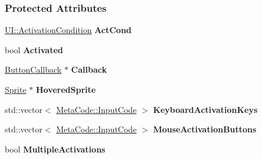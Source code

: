 \subsubsection*{Protected Attributes}
\begin{DoxyCompactItemize}
\item 
\hypertarget{classMezzanine_1_1UI_1_1Button_ab8ec63546baad2c3fe73833c55185026}{
\hyperlink{namespaceMezzanine_1_1UI_aca58497951b1b9c7da10f214da3392f0}{UI::ActivationCondition} {\bfseries ActCond}}
\label{classMezzanine_1_1UI_1_1Button_ab8ec63546baad2c3fe73833c55185026}

\item 
\hypertarget{classMezzanine_1_1UI_1_1Button_a0e48b926861702094676ea5d329933fb}{
bool {\bfseries Activated}}
\label{classMezzanine_1_1UI_1_1Button_a0e48b926861702094676ea5d329933fb}

\item 
\hypertarget{classMezzanine_1_1UI_1_1Button_a2aafa20c1e6ff918cbe6374b773f5320}{
\hyperlink{classMezzanine_1_1UI_1_1ButtonCallback}{ButtonCallback} $\ast$ {\bfseries Callback}}
\label{classMezzanine_1_1UI_1_1Button_a2aafa20c1e6ff918cbe6374b773f5320}

\item 
\hypertarget{classMezzanine_1_1UI_1_1Button_ab22a57c3999b872f7167e64c2c1aac9b}{
\hyperlink{structMezzanine_1_1UI_1_1Sprite}{Sprite} $\ast$ {\bfseries HoveredSprite}}
\label{classMezzanine_1_1UI_1_1Button_ab22a57c3999b872f7167e64c2c1aac9b}

\item 
\hypertarget{classMezzanine_1_1UI_1_1Button_a3fc77631f527f820b3ee2f00a5be50f1}{
std::vector$<$ \hyperlink{classMezzanine_1_1MetaCode_a3b5633f0145bf3287cf53a3f05b5563c}{MetaCode::InputCode} $>$ {\bfseries KeyboardActivationKeys}}
\label{classMezzanine_1_1UI_1_1Button_a3fc77631f527f820b3ee2f00a5be50f1}

\item 
\hypertarget{classMezzanine_1_1UI_1_1Button_aab112d6485c6ddd70dd638f3e8454d5d}{
std::vector$<$ \hyperlink{classMezzanine_1_1MetaCode_a3b5633f0145bf3287cf53a3f05b5563c}{MetaCode::InputCode} $>$ {\bfseries MouseActivationButtons}}
\label{classMezzanine_1_1UI_1_1Button_aab112d6485c6ddd70dd638f3e8454d5d}

\item 
\hypertarget{classMezzanine_1_1UI_1_1Button_ae3eabadf14193c4e125e64daa419527f}{
bool {\bfseries MultipleActivations}}
\label{classMezzanine_1_1UI_1_1Button_ae3eabadf14193c4e125e64daa419527f}


\end{DoxyCompactItemize}
